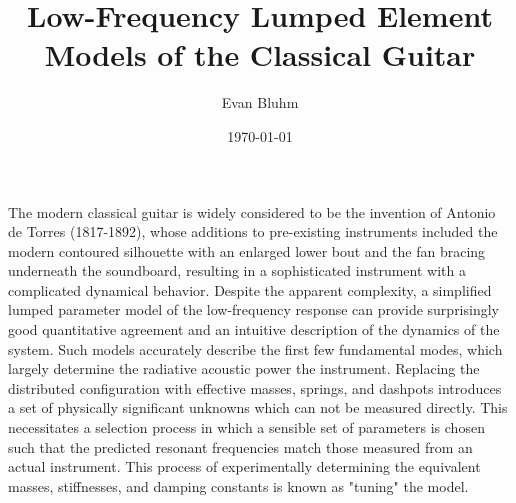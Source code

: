 \documentclass[
reprint,amsmath,amssymb,showpacs,citeautoscript,prb,twocolumn,notitlepage,floatfix
]{revtex4-1}
\begin{document}

\title{Low-Frequency Lumped Element Models of the Classical Guitar}

\author{Evan Bluhm}
 
\noaffiliation
\date{\today}



\maketitle
{}

The modern classical guitar is widely considered to be the invention of Antonio de Torres (1817-1892), whose additions to pre-existing instruments included the modern contoured silhouette with an enlarged lower bout and the fan bracing underneath the soundboard, resulting in a sophisticated instrument with a complicated dynamical behavior.\cite{Davis1990} Despite the apparent complexity, a simplified lumped parameter model of the low-frequency response can provide surprisingly good quantitative agreement and an intuitive description of the dynamics of the system. Such models accurately describe the first few fundamental modes, which largely determine the radiative acoustic power the instrument. Replacing the distributed configuration with effective masses, springs, and dashpots introduces a set of physically significant unknowns which can not be measured directly. This necessitates a selection process in which a sensible set of parameters is chosen such that the predicted resonant frequencies match those measured from an actual instrument. This process of experimentally determining the equivalent masses, stiffnesses, and damping constants is known as "tuning" the model.
\end{document}
